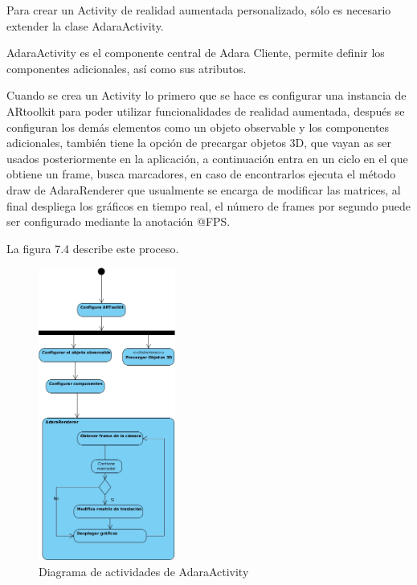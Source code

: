 \documentclass[12pt,a4paper,spanish,openany]{book}
\begin{document}
Para crear un Activity de realidad aumentada personalizado, sólo es necesario
extender la clase AdaraActivity.

AdaraActivity es el componente central de Adara Cliente, permite definir los
componentes adicionales, así como sus atributos.


Cuando se crea un Activity lo primero que se hace es configurar una instancia de
ARtoolkit para poder utilizar funcionalidades de realidad aumentada, después se
configuran los demás elementos como un objeto observable y los componentes
adicionales, también tiene la opción de precargar objetos 3D, que vayan as ser
usados posteriormente en la aplicación, a continuación entra en un ciclo en el
que  obtiene un frame, busca marcadores, en caso de encontrarlos ejecuta el
método draw de AdaraRenderer que usualmente se encarga de modificar las
matrices, al final despliega los gráficos en tiempo real, el número de frames
por segundo puede ser configurado mediante la anotación @FPS.

La figura 7.4 describe este proceso.



\begin{figure}[ht]
\begin{center}
 \includegraphics[width=0.4\textwidth]{./img/activityActivity.jpg}
\caption{Diagrama de actividades de AdaraActivity}
\end{center}
\end{figure}
\end{document}
